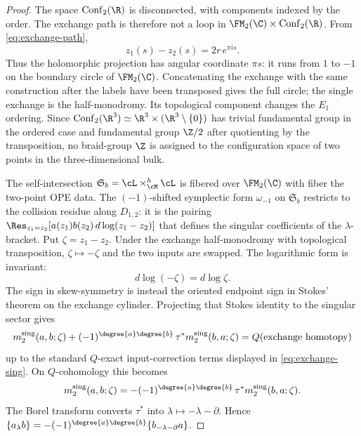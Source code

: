 \begin{proof}
The space $\mathrm{Conf}_2(\R)$ is disconnected, with components
indexed by the order. The exchange path is therefore not a loop in
$\FM_2(\C)\times\mathrm{Conf}_2(\R)$. From
\eqref{eq:exchange-path},
\[
 z_1(s)-z_2(s)=2r\,e^{\pi i s}.
\]
Thus the holomorphic projection has angular coordinate \(\pi s\):
it runs from \(1\) to \(-1\) on the boundary circle of \(\FM_2(\C)\).
Concatenating the exchange with the same construction after the labels
have been transposed gives the full circle; the single exchange is the
half-monodromy.  Its topological component changes the \(E_1\)
ordering. Since \(\mathrm{Conf}_2(\R^3)\simeq
\R^3\times(\R^3\setminus\{0\})\) has trivial fundamental group in the
ordered case and fundamental group \(\Z/2\) after quotienting by the
transposition, no braid-group \(\Z\) is assigned to the configuration
space of two points in the three-dimensional bulk.

The self-intersection $\mathfrak{S}_b = \cL \times_{\cM}^h \cL$
is fibered over $\FM_2(\C)$ with fiber the two-point OPE data.
The $(-1)$-shifted symplectic form $\omega_{-1}$ on $\mathfrak{S}_b$
restricts to the collision residue along $D_{1,2}$: it is the
pairing $\Res_{z_1 = z_2}[a(z_1) b(z_2) \, d\log(z_1 - z_2)]$
that defines the singular coefficients of the $\lambda$-bracket. Put
\(\zeta=z_1-z_2\).  Under the exchange half-monodromy with
topological transposition, \(\zeta\mapsto-\zeta\) and the two inputs
are swapped.  The logarithmic form is invariant:
\[
d\log(-\zeta)=d\log\zeta .
\]
The sign in skew-symmetry is instead the oriented endpoint sign in
Stokes' theorem on the exchange cylinder.  Projecting that Stokes
identity to the singular sector gives
\[
m_2^{\mathrm{sing}}(a,b;\zeta)
+(-1)^{\degree{a}\degree{b}}\,
\tau^\ast m_2^{\mathrm{sing}}(b,a;\zeta)
= Q(\text{exchange homotopy})
\]
up to the standard \(Q\)-exact input-correction terms displayed in
\eqref{eq:exchange-sing}.  On \(Q\)-cohomology this becomes
\[
m_2^{\mathrm{sing}}(a,b;\zeta)
=-(-1)^{\degree{a}\degree{b}}\,
\tau^\ast m_2^{\mathrm{sing}}(b,a;\zeta).
\]
The Borel transform converts \(\tau^\ast\) into
\(\lambda\mapsto-\lambda-\partial\). Hence
\(\{a_\lambda b\}=-(-1)^{\degree{a}\degree{b}}
\{b_{-\lambda-\partial}a\}\).
\end{proof}

